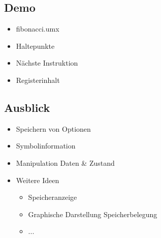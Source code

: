 \subsection{Demo}

\begin{frame}{\insertsubsection}
    \begin{itemize}
    \item fibonacci.umx
    \item Haltepunkte
    \item Nächste Instruktion
    \item Registerinhalt
    \end{itemize}
\end{frame}

\subsection{Ausblick}

\begin{frame}{\insertsubsection}
    \begin{itemize}
    \item Speichern von Optionen
    \item Symbolinformation
    \item Manipulation Daten \& Zustand
    \item Weitere Ideen
    \begin{itemize}
    	\item Speicheranzeige
    	\item Graphische Darstellung Speicherbelegung
    	\item ...
    \end{itemize}
    \end{itemize}
\end{frame}
